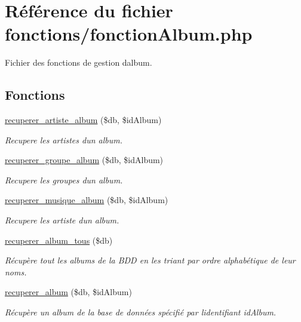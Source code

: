 \hypertarget{fonctionAlbum_8php}{}\section{Référence du fichier fonctions/fonction\+Album.php}
\label{fonctionAlbum_8php}


Fichier des fonctions de gestion d\textquotesingle{}album.  


\subsection*{Fonctions}
\begin{DoxyCompactItemize}
\item 
\hyperlink{fonctionAlbum_8php_a00cf2b1cbba7f0a49fd987ce8698e5b8}{recuperer\+\_\+artiste\+\_\+album} (\$db, \$id\+Album)
\begin{DoxyCompactList}\small\item\em Recupere les artistes d\textquotesingle{}un album. \end{DoxyCompactList}\item 
\hyperlink{fonctionAlbum_8php_a5d2684de0038530d8d534467326fbac1}{recuperer\+\_\+groupe\+\_\+album} (\$db, \$id\+Album)
\begin{DoxyCompactList}\small\item\em Recupere les groupes d\textquotesingle{}un album. \end{DoxyCompactList}\item 
\hyperlink{fonctionAlbum_8php_a5162fc7335e65ca622c67dc921a308ac}{recuperer\+\_\+musique\+\_\+album} (\$db, \$id\+Album)
\begin{DoxyCompactList}\small\item\em Recupere les artiste d\textquotesingle{}un album. \end{DoxyCompactList}\item 
\hyperlink{fonctionAlbum_8php_a46ef28eb6a8b8055a8a3429701618e8d}{recuperer\+\_\+album\+\_\+tous} (\$db)
\begin{DoxyCompactList}\small\item\em Récupère tout les albums de la B\+DD en les triant par ordre alphabétique de leur noms. \end{DoxyCompactList}\item 
\hyperlink{fonctionAlbum_8php_a623b54a1c40fb3802a5049a029d253cb}{recuperer\+\_\+album} (\$db, \$id\+Album)
\begin{DoxyCompactList}\small\item\em Récupère un album de la base de données spécifié par l\textquotesingle{}identifiant \textquotesingle{}id\+Album\textquotesingle{}. \end{DoxyCompactList}\item 

\end{DoxyCompactItemize}
